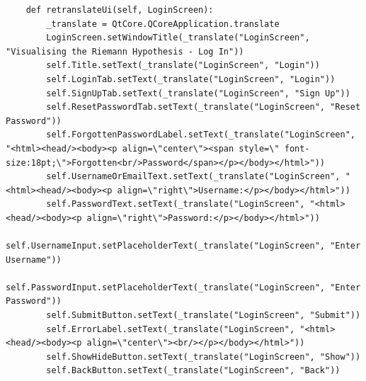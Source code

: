 \documentclass[12pt]{article}
\begin{document}
\begin{lstlisting}
    def retranslateUi(self, LoginScreen):
        _translate = QtCore.QCoreApplication.translate
        LoginScreen.setWindowTitle(_translate("LoginScreen", "Visualising the Riemann Hypothesis - Log In"))
        self.Title.setText(_translate("LoginScreen", "Login"))
        self.LoginTab.setText(_translate("LoginScreen", "Login"))
        self.SignUpTab.setText(_translate("LoginScreen", "Sign Up"))
        self.ResetPasswordTab.setText(_translate("LoginScreen", "Reset Password"))
        self.ForgottenPasswordLabel.setText(_translate("LoginScreen", "<html><head/><body><p align=\"center\"><span style=\" font-size:18pt;\">Forgotten<br/>Password</span></p></body></html>"))
        self.UsernameOrEmailText.setText(_translate("LoginScreen", "<html><head/><body><p align=\"right\">Username:</p></body></html>"))
        self.PasswordText.setText(_translate("LoginScreen", "<html><head/><body><p align=\"right\">Password:</p></body></html>"))
        self.UsernameInput.setPlaceholderText(_translate("LoginScreen", "Enter Username"))
        self.PasswordInput.setPlaceholderText(_translate("LoginScreen", "Enter Password"))
        self.SubmitButton.setText(_translate("LoginScreen", "Submit"))
        self.ErrorLabel.setText(_translate("LoginScreen", "<html><head/><body><p align=\"center\"><br/></p></body></html>"))
        self.ShowHideButton.setText(_translate("LoginScreen", "Show"))
        self.BackButton.setText(_translate("LoginScreen", "Back"))
\end{lstlisting}
\end{document}
